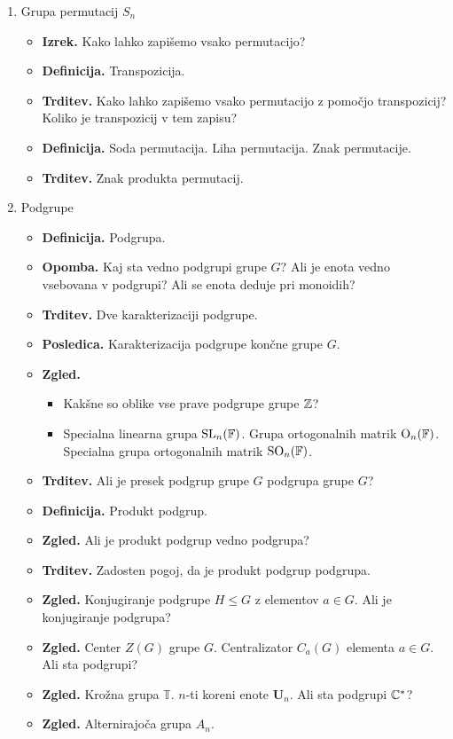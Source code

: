 \begin{enumerate}
    \item Grupa permutacij \(S_n\)
    \begin{itemize}
        \item \textbf{Izrek.} Kako lahko zapišemo vsako permutacijo?
        \item \textbf{Definicija.} Transpozicija.
        \item \textbf{Trditev.} Kako lahko zapišemo vsako permutacijo z pomočjo transpozicij? Koliko je transpozicij v tem zapisu?
        \item \textbf{Definicija.} Soda permutacija. Liha permutacija. Znak permutacije.
        \item \textbf{Trditev.} Znak produkta permutacij.
    \end{itemize}

    \item Podgrupe
    \begin{itemize}
        \item \textbf{Definicija.} Podgrupa.
        \item \textbf{Opomba.} Kaj sta vedno podgrupi grupe \(G\)? Ali je enota vedno vsebovana v podgrupi? Ali se enota deduje pri monoidih?
        \item \textbf{Trditev.} Dve karakterizaciji podgrupe.
        \item \textbf{Posledica.} Karakterizacija podgrupe končne grupe \(G\).
        \item \textbf{Zgled.} \ 
        \begin{itemize}
            \item Kakšne so oblike vse prave podgrupe grupe \(\mathbb{Z}\)?
            \item Specialna linearna grupa \(\operatorname{SL}_n(\mathbb{F})\). Grupa ortogonalnih matrik \(\text{O}_n(\mathbb{F})\). Specialna grupa ortogonalnih matrik \(\text{SO}_n(\mathbb{F})\).
        \end{itemize}
        \item \textbf{Trditev.} Ali je presek podgrup grupe \(G\) podgrupa grupe \(G\)?
        \item \textbf{Definicija.} Produkt podgrup.
        \item \textbf{Zgled.} Ali je produkt podgrup vedno podgrupa?
        \item \textbf{Trditev.} Zadosten pogoj, da je produkt podgrup podgrupa.
        \item \textbf{Zgled.} Konjugiranje podgrupe \(H \leq G\) z elementov \(a \in G\). Ali je konjugiranje podgrupa?
        \newpage
        \item \textbf{Zgled.} Center \(Z(G)\) grupe \(G\). Centralizator \(C_a(G)\) elementa \(a \in G\). Ali sta podgrupi?
        \item \textbf{Zgled.} Krožna grupa \(\mathbb{T}\). \(n\)-ti koreni enote \(\textbf{U}_n\). Ali sta podgrupi \(\mathbb{C}^*\)?
        \item \textbf{Zgled.} Alternirajoča grupa \(A_n\).
    \end{itemize}


\end{enumerate}
